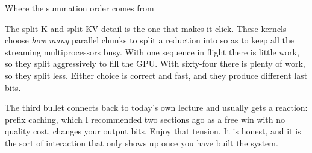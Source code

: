 \documentclass[aspectratio=169,10pt]{beamer}
\begin{document}
\begin{frame}[shrink=18]{Where the summation order comes from}
{  The split-K and split-KV detail is the one that makes it click. These kernels
  choose \emph{how many} parallel chunks to split a reduction into so as to
  keep all the streaming multiprocessors busy. With one sequence in flight
  there is little work, so they split aggressively to fill the GPU. With
  sixty-four there is plenty of work, so they split less. Either choice is
  correct and fast, and they produce different last bits.

  The third bullet connects back to today's own lecture and usually gets a
  reaction: prefix caching, which I recommended two sections ago as a free win
  with no quality cost, changes your output bits. Enjoy that tension. It is
  honest, and it is the sort of interaction that only shows up once you have
  built the system.}
\end{frame}
\end{document}

